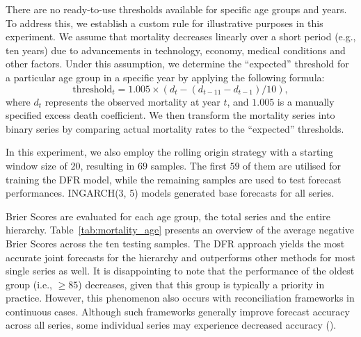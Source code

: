 \documentclass[a4paper,review,12pt,authoryear]{elsarticle}
\begin{document}
     There are no ready-to-use thresholds available for specific age groups and years.
     To address this, we establish a custom rule for illustrative purposes in this experiment.
     We assume that mortality decreases linearly over a short period (e.g., ten years) due to advancements in technology, economy, medical conditions and other factors.
     Under this assumption, we determine the ``expected'' threshold for a particular age group in a specific year by applying the following formula:
     \[
       \text{threshold}_t = 1.005 \times (d_t - (d_{t-11} - d_{t-1})/10),
     \]
     where $d_t$ represents the observed mortality at year $t$, and $1.005$ is a manually specified excess death coefficient.
     We then transform the mortality series into binary series by comparing actual mortality rates to the ``expected'' thresholds.

     In this experiment, we also employ the rolling origin strategy with a starting window size of $20$, resulting in $69$ samples.
     The first $59$ of them are utilised for training the DFR model, while the remaining samples are used to test forecast performances.
     INGARCH(3, 5) models generated base forecasts for all series.

     Brier Scores are evaluated for each age group, the total series and the entire hierarchy.
     Table~\ref{tab:mortality_age} presents an overview of the average negative Brier Scores across the ten testing samples.
     The DFR approach yields the most accurate joint forecasts for the hierarchy and outperforms other methods for most single series as well.
     It is disappointing to note that the performance of the oldest group (i.e., $ \ge 85$) decreases, given that this group is typically a priority in practice.
     However, this phenomenon also occurs with reconciliation frameworks in continuous cases.
     Although such frameworks generally improve forecast accuracy across all series, some individual series may experience decreased accuracy (\citealp{zhangOptimalReconciliationImmutable2022a}).
\end{document}
